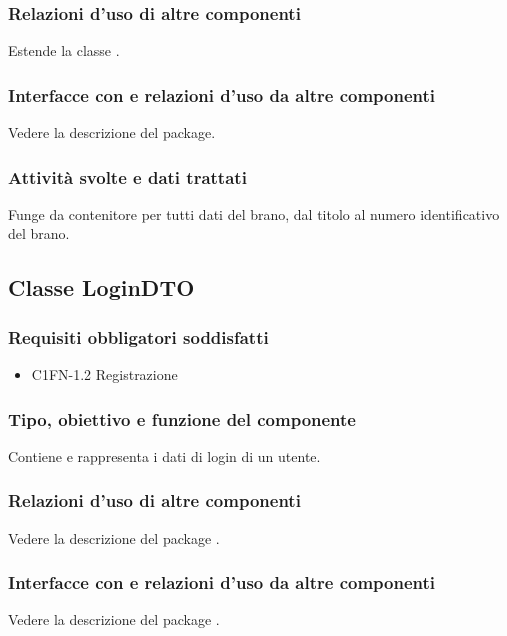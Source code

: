 \subsubsection*{Relazioni d'uso di altre componenti}
Estende la classe .
\subsubsection*{Interfacce con e relazioni d'uso da altre componenti}
Vedere la descrizione del package.
\subsubsection*{Attivit\`a svolte e dati trattati}
Funge da contenitore per tutti dati del brano, dal titolo al numero
identificativo del brano. 

\subsection{Classe LoginDTO}
\subsubsection*{Requisiti obbligatori soddisfatti}
\begin{itemize}
	\item C1FN-1.2 Registrazione
\end{itemize}
\subsubsection*{Tipo, obiettivo e funzione del componente}
Contiene e rappresenta i dati di login di un utente.
\subsubsection*{Relazioni d'uso di altre componenti}
Vedere la descrizione del package .
\subsubsection*{Interfacce con e relazioni d'uso da altre componenti}
Vedere la descrizione del package .

